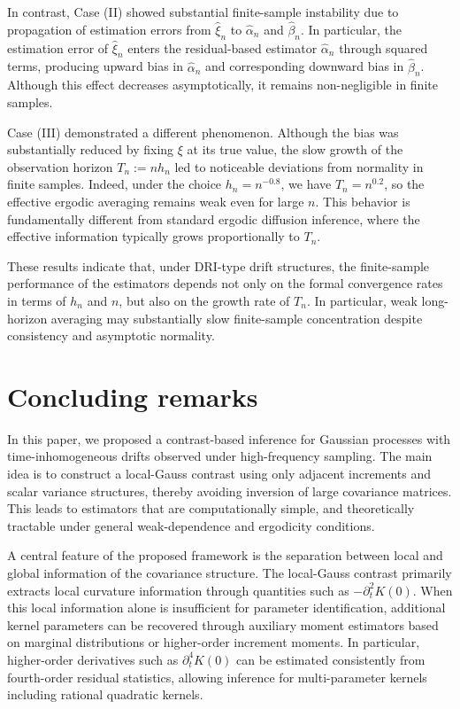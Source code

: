 \documentclass[a4paper,10pt,twoside]{article}
\numberwithin{equation}{section}
\def\p{\partial}
\begin{document}
In contrast, Case (II) showed substantial finite-sample instability due to propagation of estimation errors from $\widehat{\xi}_n$ to $\widehat{\alpha}_n$ and $\widehat{\beta}_n$.
In particular, the estimation error of $\widehat{\xi}_n$ enters the residual-based estimator $\widehat{\alpha}_n$ through squared terms, producing upward bias in $\widehat{\alpha}_n$ and corresponding downward bias in $\widehat{\beta}_n$.
Although this effect decreases asymptotically, it remains non-negligible in finite samples.

Case (III) demonstrated a different phenomenon.
Although the bias was substantially reduced by fixing $\xi$ at its true value, the slow growth of the observation horizon $T_n := nh_n$ led to noticeable deviations from normality in finite samples.
Indeed, under the choice $h_n = n^{-0.8}$, we have $T_n = n^{0.2}$, so the effective ergodic averaging remains weak even for large $n$.
This behavior is fundamentally different from standard ergodic diffusion inference, where the effective information typically grows proportionally to $T_n$.

These results indicate that, under DRI-type drift structures, the finite-sample performance of the estimators depends not only on the formal convergence rates in terms of $h_n$ and $n$, but also on the growth rate of $T_n$.
In particular, weak long-horizon averaging may substantially slow finite-sample concentration despite consistency and asymptotic normality.





\section{Concluding remarks}\label{sec:remark}

In this paper, we proposed a contrast-based inference  for Gaussian processes with time-inhomogeneous drifts observed under high-frequency sampling.
The main idea is to construct a local-Gauss contrast using only adjacent increments and scalar variance structures, thereby avoiding inversion of large covariance matrices.
This leads to estimators that are computationally simple, and theoretically tractable under general weak-dependence and ergodicity conditions.

A central feature of the proposed framework is the separation between local and global information of the covariance structure.
The local-Gauss contrast primarily extracts local curvature information through quantities such as $-\p_t^2 K(0)$.
When this local information alone is insufficient for parameter identification, additional kernel parameters can be recovered through auxiliary moment estimators based on marginal distributions or higher-order increment moments.
In particular, higher-order derivatives such as $\p_t^4 K(0)$ can be estimated consistently from fourth-order residual statistics, allowing inference for multi-parameter kernels including rational quadratic kernels.
\end{document}
